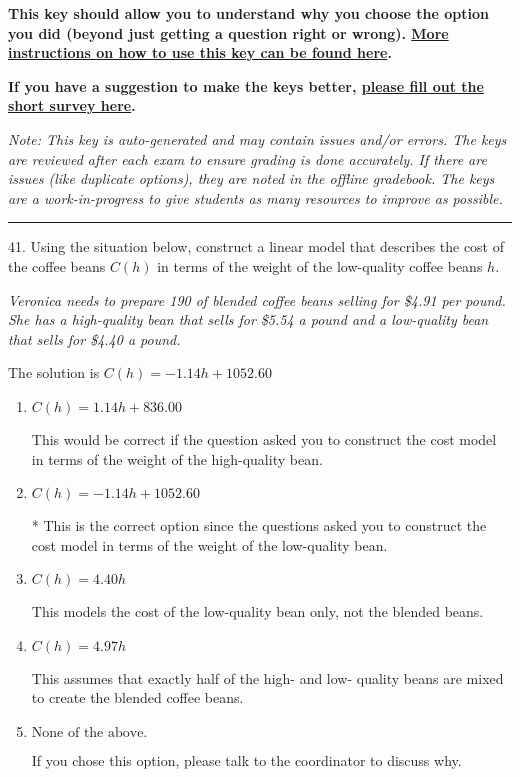 \documentclass{article}[14pt]
\begin{document}
\textbf{This key should allow you to understand why you choose the option you did (beyond just getting a question right or wrong). \href{https://xronos.clas.ufl.edu/mac1105spring2020/courseDescriptionAndMisc/Exams/LearningFromResults}{More instructions on how to use this key can be found here}.}

\textbf{If you have a suggestion to make the keys better, \href{https://forms.gle/CZkbZmPbC9XALEE88}{please fill out the short survey here}.}

\textit{Note: This key is auto-generated and may contain issues and/or errors. The keys are reviewed after each exam to ensure grading is done accurately. If there are issues (like duplicate options), they are noted in the offline gradebook. The keys are a work-in-progress to give students as many resources to improve as possible.}

\rule{\textwidth}{0.4pt}

41. Using the situation below, construct a linear model that describes the cost of the coffee beans $C(h)$ in terms of the weight of the low-quality coffee beans $h$.
 \begin{center} \textit{Veronica needs to prepare 190 of blended coffee beans selling for \$4.91 per pound. She has a high-quality bean that sells for \$5.54 a pound and a low-quality bean that sells for \$4.40 a pound.} \end{center} 
The solution is $ C(h) = -1.14 h + 1052.60 $ 

\begin{enumerate}[label=\Alph*.] 
\item $ C(h) = 1.14 h + 836.00 $ 

 This would be correct if the question asked you to construct the cost model in terms of the weight of the high-quality bean. 
\item $ C(h) = -1.14 h + 1052.60 $ 

 * This is the correct option since the questions asked you to construct the cost model in terms of the weight of the low-quality bean. 
\item $ C(h) = 4.40 h $ 

 This models the cost of the low-quality bean only, not the blended beans. 
\item $ C(h) = 4.97 h $ 

 This assumes that exactly half of the high- and low- quality beans are mixed to create the blended coffee beans. 
\item $ \text{None of the above.} $ 

 If you chose this option, please talk to the coordinator to discuss why. 
\end{enumerate} 
 
\end{document}
